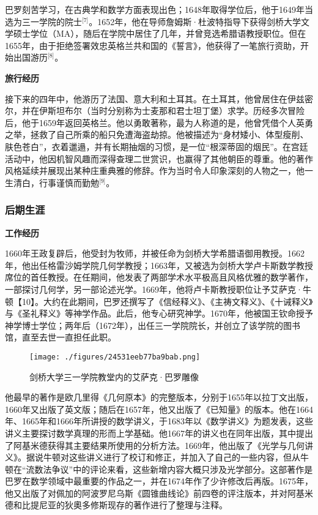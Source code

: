 巴罗刻苦学习，在古典学和数学方面表现出色；1648年取得学位后，他于1649年当选为三一学院的院士\(^\text{[7]}\)。1652年，他在导师詹姆斯·杜波特指导下获得剑桥大学文学硕士学位（MA），随后在学院中居住了几年，并曾竞选希腊语教授职位。但在1655年，由于拒绝签署效忠英格兰共和国的《誓言》，他获得了一笔旅行资助，开始出国游历\(^\text{[8]}\)。

\textbf{旅行经历}

接下来的四年中，他游历了法国、意大利和土耳其。在土耳其，他曾居住在伊兹密尔，并在伊斯坦布尔（当时分别称为士麦那和君士坦丁堡）求学。历经多次冒险后，他于1659年返回英格兰。他以勇敢著称，最为人称道的是，他曾凭借个人英勇之举，拯救了自己所乘的船只免遭海盗劫掠。他被描述为“身材矮小、体型瘦削、肤色苍白”，衣着邋遢，并有长期抽烟的习惯，是一位“根深蒂固的烟民”。在宫廷活动中，他因机智风趣而深得查理二世赏识，也赢得了其他朝臣的尊重。他的著作风格延续并展现出某种庄重典雅的修辞。作为当时令人印象深刻的人物之一，他一生清白，行事谨慎而勤勉\(^\text{[9]}\)。
\subsubsection{后期生涯}
\textbf{工作经历}

1660年王政复辟后，他受封为牧师，并被任命为剑桥大学希腊语御用教授。1662年，他出任格雷沙姆学院几何学教授；1663年，又被选为剑桥大学卢卡斯数学教授席位的首任教授。在任期间，他发表了两部学术水平极高且风格优雅的数学著作，一部探讨几何学，另一部论述光学。1669年，他将卢卡斯教授职位让予艾萨克·牛顿【10】。大约在此期间，巴罗还撰写了《信经释义》、《主祷文释义》、《十诫释义》与《圣礼释义》等神学作品。此后，他专心研究神学。1670年，他被国王钦命授予神学博士学位；两年后（1672年），出任三一学院院长，并创立了该学院的图书馆，直至去世一直担任此职。
\begin{figure}[ht]
\centering
\texttt{[image: ./figures/24531eeb77ba9bab.png]}
\caption{剑桥大学三一学院教堂内的艾萨克·巴罗雕像} \label{fig_ASKbl_3}
\end{figure}
他最早的著作是欧几里得《几何原本》的完整版本，分别于1655年以拉丁文出版，1660年又出版了英文版；随后在1657年，他又出版了《已知量》的版本。他在1664年、1665年和1666年所讲授的数学讲义，于1683年以《数学讲义》为题发表，这些讲义主要探讨数学真理的形而上学基础。他1667年的讲义也在同年出版，其中提出了阿基米德获得其主要结果所使用的分析方法。1669年，他出版了《光学与几何讲义》。据说牛顿对这些讲义进行了校订和修正，并加入了自己的一些内容，但从牛顿在“流数法争议”中的评论来看，这些新增内容大概只涉及光学部分。这部著作是巴罗在数学领域中最重要的作品之一，并在1674年作了少许修改后再版。1675年，他又出版了对佩加的阿波罗尼乌斯《圆锥曲线论》前四卷的评注版本，并对阿基米德和比提尼亚的狄奧多修斯现存的著作进行了整理与注释。

